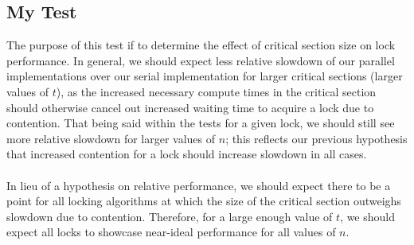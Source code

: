 \documentclass[]{article}
\begin{document}
\subsection{My Test}
The purpose of this test if to determine the effect of critical section size on lock performance. In general, we should expect less relative slowdown of our parallel implementations over our serial implementation for larger critical sections (larger values of $t$), as the increased necessary compute times in the critical section should otherwise cancel out increased waiting time to acquire a lock due to contention. That being said within the tests for a given lock, we should still see more relative slowdown for larger values of $n$; this reflects our previous hypothesis that increased contention for a lock should increase slowdown in all cases.
\\\\
In lieu of a hypothesis on relative performance, we should expect there to be a point for all locking algorithms at which the size of the critical section outweighs slowdown due to contention. Therefore, for a large enough value of $t$, we should expect all locks to showcase near-ideal performance for all values of $n$.
\end{document}
